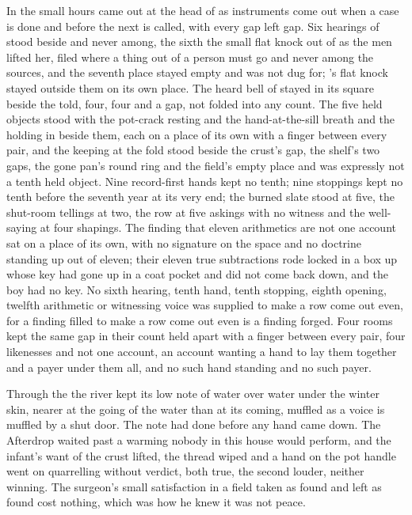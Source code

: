 \scenebreak

In the small hours  came out at the head of  as instruments come out when a case is done and before the next is called, with every gap left gap. Six hearings of  stood beside and never among, the sixth the small flat knock out of  as the men lifted her, filed where a thing out of a person must go and never among the sources, and the seventh place stayed empty and was not dug for; 's flat knock stayed outside them on its own place. The heard bell of  stayed in its square beside the told, four, four and a gap, not folded into any count. The five held objects stood with the pot-crack resting and the hand-at-the-sill breath and the holding in  beside them, each on a place of its own with a finger between every pair, and the keeping at the fold stood beside the crust's gap, the shelf's two gaps, the gone pan's round ring and the field's empty place and was expressly not a tenth held object. Nine record-first hands kept no tenth; nine stoppings kept no tenth before the seventh year at its very end; the burned slate stood at five, the shut-room tellings at two, the row at five askings with no witness and the well-saying at four shapings. The finding that eleven arithmetics are not one account sat on a place of its own, with no signature on the space and no doctrine standing up out of eleven; their eleven true subtractions rode locked in a box up  whose key had gone up in a coat pocket and did not come back down, and the boy had no key. No sixth hearing, tenth hand, tenth stopping, eighth opening, twelfth arithmetic or witnessing voice was supplied to make a row come out even, for a finding filled to make a row come out even is a finding forged. Four rooms kept the same gap in their count held apart with a finger between every pair, four likenesses and not one account, an account wanting a hand to lay them together and a payer under them all, and no such hand standing and no such payer.

Through the  the river kept its low note of water over water under the winter skin, nearer at the going of the water than at its coming, muffled as a voice is muffled by a shut door. The note had done before any hand came down. The Afterdrop waited past a warming nobody in this house would perform, and the infant's want of the crust lifted, the thread wiped and a hand on the pot handle went on quarrelling without verdict, both true, the second louder, neither winning. The surgeon's small satisfaction in a field taken as found and left as found cost nothing, which was how he knew it was not peace.

